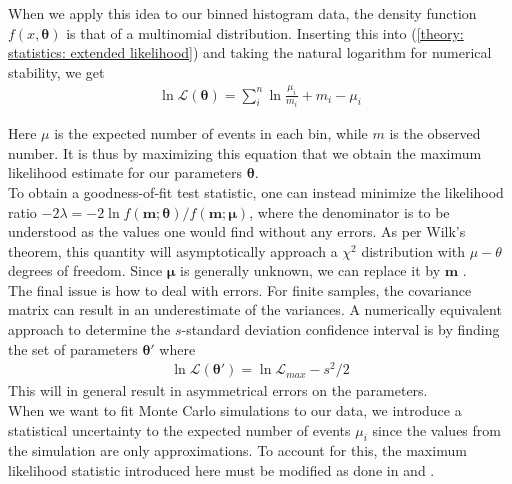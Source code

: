 When we apply this idea to our binned histogram data, the density function $f(x, \bm{\theta})$ is that of a multinomial distribution. Inserting this into (\ref{theory: statistics: extended likelihood}) and taking the natural logarithm for numerical stability, we get
\begin{align}
	\ln \mathcal{L}(\bm{\theta}) = \sum^n_i  \ln \frac{\mu_i}{m_i} + m_i - \mu_i
\end{align}

Here $\mu$ is the expected number of events in each bin, while $m$ is the observed number. It is thus by maximizing this equation that we obtain the maximum likelihood estimate for our parameters $\bm{\theta}$. \\

To obtain a goodness-of-fit test statistic, one can instead minimize the likelihood ratio $-2\lambda = -2\ln f(\bm{m}; \bm{\theta})/f(\bm{m}; \bm{\mu})$, where the denominator is to be understood as the values one would find without any errors. As per Wilk's theorem, this quantity will asymptotically approach a $\chi^2$ distribution with $\mu - \theta$ degrees of freedom. Since $\bm{\mu}$ is generally unknown, we can replace it by $\bm{m}$ \cite{Baker}. \\

The final issue is how to deal with errors. For finite samples, the covariance matrix can result in an underestimate of the variances. A numerically equivalent approach to determine the $s$-standard deviation confidence interval is by finding the set of parameters $\bm{\theta}'$ where
\begin{align*}
	\ln \mathcal{L}(\bm{\theta}') = \ln \mathcal{L}_{max} - s^2/2
\end{align*}
This will in general result in asymmetrical errors on the parameters. \cite{Cowan} \\

When we want to fit Monte Carlo simulations to our data, we introduce a statistical uncertainty to the expected number of events $\mu_i$ since the values from the simulation are only approximations. To account for this, the maximum likelihood statistic introduced here must be modified as done in \cite{Kuhlwein} and \cite{Barlow}.

